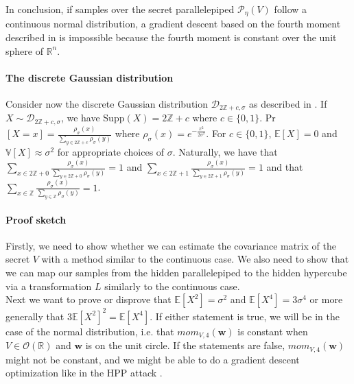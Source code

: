 \documentclass[12 pt]{article}        	%
\newcommand{\PP}[2][]{\mathcal{P}_{#1}(\mat{#2})}
\newcommand{\mat}[1]{\mathit{#1}}
\renewcommand{\vec}[1]{\mathbf{#1}}
\newcommand{\bb}[1]{\mathbb{#1}}
\begin{document}
In conclusion, if samples over the secret parallelepiped $\PP[\eta]{V}$ follow a continuous normal distribution, a gradient descent based on the fourth moment described in \cite{NR09}
is impossible because the fourth moment is constant over the unit sphere of $\bb{R}^n$.

\paragraph{The discrete Gaussian distribution}
Consider now the discrete Gaussian distribution $\mathcal{D}_{2 \bb{Z} + c, \sigma}$ as described in \cite{HawkSpec24}. 
If $X \sim \mathcal{D}_{2 \bb{Z} + c, \sigma}$, we have Supp$(X) = 2 \bb{Z} + c$ where $c \in \{0, 1\}$. Pr$[X = x] = \frac{\rho_{\sigma}(x)}{\sum_{y \in 2 \bb{Z} + c} \rho_{\sigma}(y)}$
where $\rho_{\sigma}(x) = e^{-\frac{x^2}{2 \sigma^2}}$. For $c \in \{0, 1 \}$, $\bb{E}[X] = 0$ and $\bb{V}[X] \approx \sigma^2$ for appropriate choices of $\sigma$.
Naturally, we have that $\sum_{x \in 2\bb{Z}+0}\frac{\rho_{\sigma}(x)}{\sum_{y \in 2 \bb{Z} + 0} \rho_{\sigma}(y)} = 1$
and $\sum_{x \in 2\bb{Z}+1}\frac{\rho_{\sigma}(x)}{\sum_{y \in 2 \bb{Z} + 1} \rho_{\sigma}(y)} = 1$
and that $\sum_{x \in \bb{Z}}\frac{\rho_{\sigma}(x)}{\sum_{y \in \bb{Z}} \rho_{\sigma}(y)} = 1$. \\

\paragraph{Proof sketch}
Firstly, we need to show whether we can estimate the covariance matrix of the secret $\mat{V}$ with a method similar to the continuous case.
We also need to show that we can map our samples from the hidden parallelepiped to the hidden hypercube via a transformation $\mat{L}$ similarly to the continuous case. \\
Next we want to prove or disprove that $\bb{E}[X^2] = \sigma^2$ and $\bb{E}[X^4] = 3 \sigma ^4$ or more generally that $3 \bb{E}[X^2]^2 = \bb{E}[X^4]$. 
If either statement is true, we will be in the case of the normal distribution, i.e. that $mom_{\mat{V}, 4}(\vec{w})$ is constant when 
$\mat{V} \in \mathcal{O}(\bb{R})$ and $\vec{w}$ is on the unit circle.
If the statements are false, $mom_{\mat{V}, 4}(\vec{w})$ might not be constant, and we might be able to do a gradient descent optimization like in the HPP attack \cite{NR09}.
\end{document}
